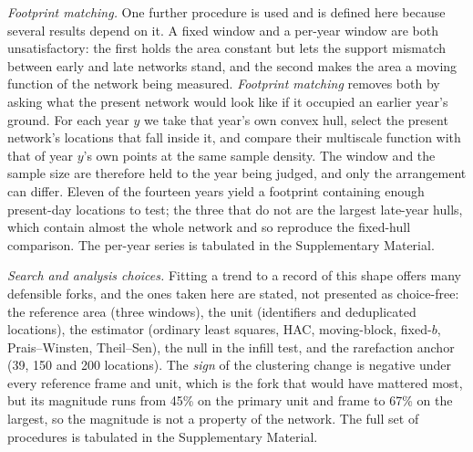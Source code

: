 \documentclass{article}
\newcommand{\rDrop}{67}
\newcommand{\locHullDrop}{45}
\begin{document}
\noindent\emph{Footprint matching.} One further procedure is used and is defined here because
several results depend on it. A fixed window and a per-year window are both unsatisfactory: the
first holds the area constant but lets the support mismatch between early and late networks
stand, and the second makes the area a moving function of the network being measured.
\emph{Footprint matching} removes both by asking what the present network would look like if it
occupied an earlier year's ground. For each year $y$ we take that year's own convex hull, select
the present network's locations that fall inside it, and compare their multiscale function with
that of year $y$'s own points at the same sample density. The window and the sample size are
therefore held to the year being judged, and only the arrangement can differ. Eleven of the
fourteen years yield a footprint containing enough present-day locations to test; the three that
do not are the largest late-year hulls, which contain almost the whole network and so reproduce
the fixed-hull comparison. The per-year series is tabulated in the Supplementary Material.

\noindent\emph{Search and analysis choices.} Fitting a trend to a record of this shape offers
many defensible forks, and the ones taken here are stated, not presented as
choice-free: the reference area (three windows), the unit (identifiers and deduplicated
locations), the estimator (ordinary least squares, HAC, moving-block, fixed-$b$, Prais--Winsten,
Theil--Sen), the null in the infill test, and the rarefaction anchor (39, 150 and 200 locations).
The \emph{sign} of the clustering change is negative under every reference frame and unit, which
is the fork that would have mattered most, but its magnitude runs from \locHullDrop\% on the
primary unit and frame to \rDrop\% on the largest, so the magnitude is not a property of the
network. The full set of procedures is tabulated in the Supplementary Material.
\end{document}
